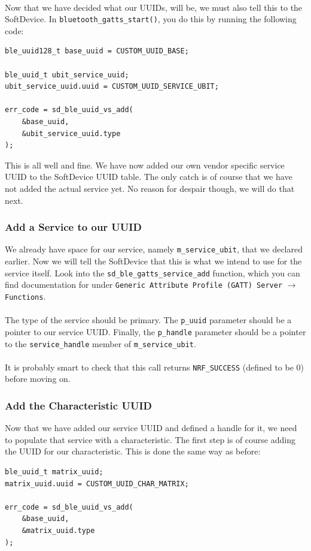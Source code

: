 \documentclass[11pt,a4paper]{article}
\begin{document}
\\
Now that we have decided what our UUIDs, will be, we must also tell this to the SoftDevice. In \texttt{bluetooth_gatts_start()}, you do this by running the following code:
\begin{verbatim}
ble_uuid128_t base_uuid = CUSTOM_UUID_BASE;

ble_uuid_t ubit_service_uuid;
ubit_service_uuid.uuid = CUSTOM_UUID_SERVICE_UBIT;

err_code = sd_ble_uuid_vs_add(
	&base_uuid,
	&ubit_service_uuid.type
);
\end{verbatim}
This is all well and fine. We have now added our own vendor specific service UUID to the SoftDevice UUID table. The only catch is of course that we have not added the actual service yet. No reason for despair though, we will do that next.

\subsubsection{Add a Service to our UUID}
We already have space for our service, namely \texttt{m_service_ubit}, that we declared earlier. Now we will tell the SoftDevice that this is what we intend to use for the service itself. Look into the \texttt{sd_ble_gatts_service_add} function, which you can find documentation for under \texttt{Generic Attribute Profile (GATT) Server} $\rightarrow$ \texttt{Functions}.\\
\\
The type of the service should be primary. The \texttt{p_uuid} parameter should be a pointer to our service UUID. Finally, the \texttt{p_handle} parameter should be a pointer to the \texttt{service_handle} member of \texttt{m_service_ubit}.\\
\\
It is probably smart to check that this call returns \texttt{NRF_SUCCESS} (defined to be 0) before moving on.

\subsubsection{Add the Characteristic UUID}
Now that we have added our service UUID and defined a handle for it, we need to populate that service with a characteristic. The first step is of course adding the UUID for our characteristic. This is done the same way as before:
\begin{verbatim}
ble_uuid_t matrix_uuid;
matrix_uuid.uuid = CUSTOM_UUID_CHAR_MATRIX;

err_code = sd_ble_uuid_vs_add(
	&base_uuid,
	&matrix_uuid.type
);
\end{verbatim}
\end{document}
